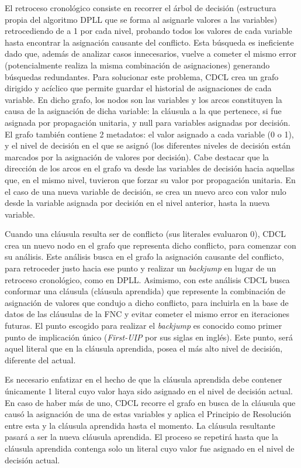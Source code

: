 El retroceso cronológico consiste en recorrer el árbol de decisión (estructura propia del algoritmo DPLL que se forma al asignarle valores a las variables) retrocediendo de a 1 por cada nivel, probando todos los valores de cada variable hasta encontrar la asignación causante del conflicto. Esta búsqueda es ineficiente dado que, además de analizar casos innecesarios, vuelve a cometer el mismo error (potencialmente realiza la misma combinación de asignaciones) generando búsquedas redundantes.
Para solucionar este problema, CDCL crea un grafo dirigido y acíclico que permite guardar el historial de asignaciones de cada variable. En dicho grafo, los nodos son las variables y los arcos constituyen la causa de la asignación de dicha variable: la cláusula a la que pertenece, si fue asignada por propagación unitaria, y null para variables asignadas por decisión. El grafo también contiene 2 metadatos: el valor asignado a cada variable (0 o 1), y el nivel de decisión en el que se asignó (los diferentes niveles de decisión están marcados por la asignación de valores por decisión). Cabe destacar que la dirección de los arcos en el grafo va desde las variables de decisión hacia aquellas que, en el mismo nivel, tuvieron que forzar su valor por propagación unitaria. En el caso de una nueva variable de decisión, se crea un nuevo arco con valor nulo desde la variable asignada por decisión en el nivel anterior, hasta la nueva variable.

Cuando una cláusula resulta ser de conflicto (sus literales evaluaron 0), CDCL crea un nuevo nodo en el grafo que representa dicho conflicto, para comenzar con su análisis.
Este análisis busca en el grafo la asignación causante del conflicto, para retroceder justo hacia ese punto y realizar un \textit{backjump} en lugar de un retroceso cronológico, como en DPLL. Asimismo, con este análisis CDCL busca conformar una cláusula (cláusula aprendida) que represente la combinación de asignación de valores que condujo a dicho conflicto, para incluirla en la base de datos de las cláusulas de la FNC y evitar cometer el mismo error en iteraciones futuras. El punto escogido para realizar el \textit{backjump} es conocido como primer punto de implicación único (\textit{First-UIP} por sus siglas en inglés). Este punto, será aquel literal que en la cláusula aprendida, posea el más alto nivel de decisión, diferente del actual.

Es necesario enfatizar en el hecho de que la cláusula aprendida debe contener únicamente 1 literal cuyo valor haya sido asignado en el nivel de decisión actual. En caso de haber más de uno, CDCL recorre el grafo en busca de la cláusula que causó la asignación de una de estas variables y aplica el Principio de Resolución entre esta y la cláusula aprendida hasta el momento. La cláusula resultante pasará a ser la nueva cláusula aprendida. El proceso se repetirá hasta que la cláusula aprendida contenga solo un literal cuyo valor fue asignado en el nivel de decisión actual.

